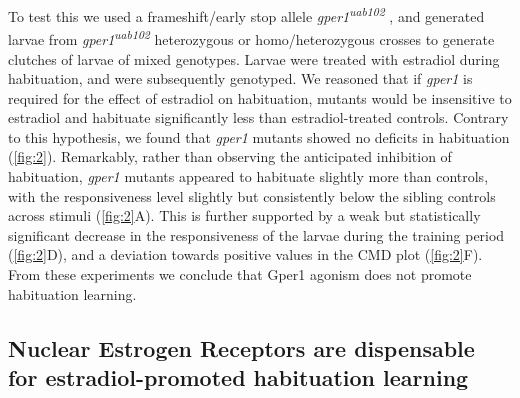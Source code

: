 \documentclass[9pt,lineno]{RandlettLab_elife}
\begin{document}
{To test this we used a frameshift/early stop allele \emph{gper1\textsuperscript{uab102}} \citep{Romano2017-ep}, and generated larvae from \emph{gper1\textsuperscript{uab102}} heterozygous or homo/heterozygous crosses to generate clutches of larvae of mixed genotypes. 
Larvae were treated with estradiol during habituation, and were subsequently genotyped. 
We reasoned that if \emph{gper1} is required for the effect of estradiol on habituation, mutants would be insensitive to estradiol and habituate significantly less than estradiol-treated controls. 
Contrary to this hypothesis, we found that \emph{gper1} mutants showed no deficits in habituation (\autoref{fig:2}). 
Remarkably, rather than observing the anticipated inhibition of habituation, \emph{gper1} mutants appeared to habituate slightly more than controls, with the responsiveness level slightly but consistently below the sibling controls across stimuli (\autoref{fig:2}A). 
This is further supported by a weak but statistically significant decrease in the responsiveness of the larvae during the training period (\autoref{fig:2}D), and a deviation towards positive values in the CMD plot (\autoref{fig:2}F). 
From these experiments we conclude that Gper1 agonism does not promote habituation learning. 


\subsection{Nuclear Estrogen Receptors are dispensable for estradiol-promoted habituation learning}

}
\end{document}
